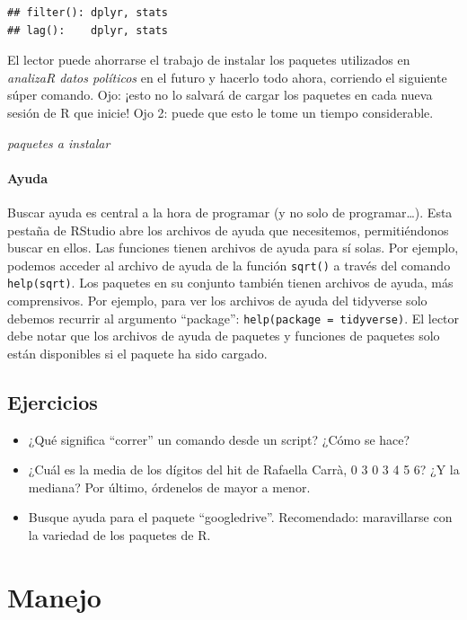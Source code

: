 \documentclass[]{book}
\providecommand{\tightlist}{%
  \setlength{\itemsep}{0pt}\setlength{\parskip}{0pt}}
\begin{document}
\begin{verbatim}
## filter(): dplyr, stats
## lag():    dplyr, stats
\end{verbatim}

El lector puede ahorrarse el trabajo de instalar los paquetes utilizados
en \emph{analizaR datos políticos} en el futuro y hacerlo todo ahora,
corriendo el siguiente súper comando. Ojo: ¡esto no lo salvará de cargar
los paquetes en cada nueva sesión de R que inicie! Ojo 2: puede que esto
le tome un tiempo considerable.

\emph{paquetes a instalar}

\subsubsection{Ayuda}\label{ayuda}

Buscar ayuda es central a la hora de programar (y no solo de
programar\ldots{}). Esta pestaña de RStudio abre los archivos de ayuda
que necesitemos, permitiéndonos buscar en ellos. Las funciones tienen
archivos de ayuda para sí solas. Por ejemplo, podemos acceder al archivo
de ayuda de la función \texttt{sqrt()} a través del comando
\texttt{help(sqrt)}. Los paquetes en su conjunto también tienen archivos
de ayuda, más comprensivos. Por ejemplo, para ver los archivos de ayuda
del tidyverse solo debemos recurrir al argumento ``package'':
\texttt{help(package\ =\ tidyverse)}. El lector debe notar que los
archivos de ayuda de paquetes y funciones de paquetes solo están
disponibles si el paquete ha sido cargado.

\section{Ejercicios}\label{ejercicios}

\begin{itemize}
\tightlist
\item
  ¿Qué significa ``correr'' un comando desde un script? ¿Cómo se hace?
\item
  ¿Cuál es la media de los dígitos del hit de Rafaella Carrà, 0 3 0 3 4
  5 6? ¿Y la mediana? Por último, órdenelos de mayor a menor.
\item
  Busque ayuda para el paquete ``googledrive''. Recomendado:
  maravillarse con la variedad de los paquetes de R.
\end{itemize}

\chapter{Manejo}\label{manejo}
\end{document}
